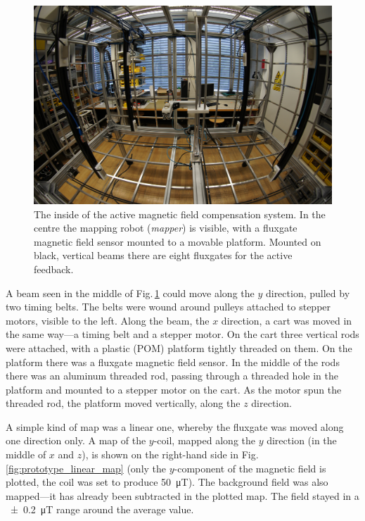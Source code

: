 \begin{figure}
  \centering
  \includegraphics[width=0.9\linewidth]{gfx/prototype/DSC03476.JPG}
  \caption{The inside of the active magnetic field compensation system. In the centre the mapping robot (\emph{mapper}) is visible, with a fluxgate magnetic field sensor mounted to a movable platform. Mounted on black, vertical beams there are eight fluxgates for the active feedback.}
  \label{fig:prototype_photo_inside}
\end{figure}

A beam seen in the middle of Fig.\,\ref{fig:prototype_photo_inside} could move along the $y$ direction, pulled by two timing belts. The belts were wound around pulleys attached to stepper motors, visible to the left. Along the beam, the $x$ direction, a cart was moved in the same way---a timing belt and a stepper motor. On the cart three vertical rods were attached, with a plastic (POM) platform tightly threaded on them. On the platform there was a fluxgate magnetic field sensor.
In the middle of the rods there was an aluminum threaded rod, passing through a threaded hole in the platform and mounted to a stepper motor on the cart. As the motor spun the threaded rod, the platform moved vertically, along the $z$ direction.

A simple kind of map was a linear one, whereby the fluxgate was moved along one direction only. A map of the $y$-coil, mapped along the $y$ direction (in the middle of $x$ and $z$), is shown on the right-hand side in Fig.\,\ref{fig:prototype_linear_map} (only the $y$-component of the magnetic field is plotted, the coil was set to produce \SI{50}{\micro\tesla}). The background field was also mapped---it has already been subtracted in the plotted map. The field stayed in a \SI{\pm 0.2}{\micro\tesla} range around the average value.

